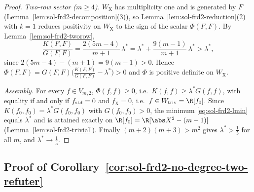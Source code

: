 \documentclass[../main.tex]{subfiles}
\begin{document}
\begin{proof}
\emph{Two-row sector ($m\ge4$).}  $W_{\mathrm X}$ has multiplicity one and is
generated by $F$ (Lemma~\ref{lem:sol-frd2-decomposition}(3)), so
Lemma~\ref{lem:sol-frd2-reduction}(2) with $k=1$ reduces positivity on
$W_{\mathrm X}$ to the sign of the scalar $\Phi(F,F)$.  By
Lemma~\ref{lem:sol-frd2-tworow},
\[
  \frac{K(F,F)}{G(F,F)}
  =\frac{2(5m-4)}{m+1}\,\lambda^*
  =\lambda^*+\frac{9(m-1)}{m+1}\,\lambda^*
  >\lambda^*,
\]
since $2(5m-4)-(m+1)=9(m-1)>0$.  Hence
$\Phi(F,F)=G(F,F)\bigl(\tfrac{K(F,F)}{G(F,F)}-\lambda^*\bigr)>0$ and $\Phi$ is
positive definite on $W_{\mathrm X}$.

\emph{Assembly.}  For every $f\in V_{m,2}$,
$\Phi(f,f)\ge0$, i.e.\ $K(f,f)\ge\lambda^*G(f,f)$, with equality if and only if
$f_{\rm std}=0$ and $f_{\mathrm X}=0$, i.e.\ $f\in W_{\rm triv}=\R[f_0]$.  Since
$K(f_0,f_0)=\lambda^*G(f_0,f_0)$ with $G(f_0,f_0)>0$, the minimum
\eqref{eq:sol-frd2-lmin} equals $\lambda^*$ and is attained exactly on
$\R[f_0]=\R[\abs X^2-(m-1)]$ (Lemma~\ref{lem:sol-frd2-trivial}).  Finally
$(m+2)(m+3)>m^2$ gives $\lambda^*>\tfrac15$ for all $m$, and
$\lambda^*\to\tfrac15$.
\end{proof}

\subsection*{Proof of Corollary~\ref{cor:sol-frd2-no-degree-two-refuter}}
\end{document}

